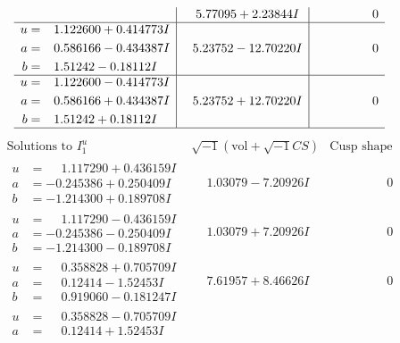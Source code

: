 \documentclass[1p]{elsarticle_modified}
\theoremstyle{definition}
\newcommand{\I}{\sqrt{-1}}
\begin{document}
$$\begin{array}{c|c|c}
 & \phantom{-}5.77095 + 2.23844 I & \phantom{-0.000000 } 0 \\ \hline\begin{aligned}
u &= \phantom{-}1.122600 + 0.414773 I \\
a &= \phantom{-}0.586166 - 0.434387 I \\
b &= \phantom{-}1.51242 - 0.18112 I\end{aligned}
 & \phantom{-}5.23752 - 12.70220 I & \phantom{-0.000000 } 0 \\ \hline\begin{aligned}
u &= \phantom{-}1.122600 - 0.414773 I \\
a &= \phantom{-}0.586166 + 0.434387 I \\
b &= \phantom{-}1.51242 + 0.18112 I\end{aligned}
 & \phantom{-}5.23752 + 12.70220 I & \phantom{-0.000000 } 0\\
 \hline 
 \end{array}$$\newpage$$\begin{array}{c|c|c}  
\text{Solutions to }I^u_{1}& \I (\text{vol} + \sqrt{-1}CS) & \text{Cusp shape}\\
 \hline 
\begin{aligned}
u &= \phantom{-}1.117290 + 0.436159 I \\
a &= -0.245386 + 0.250409 I \\
b &= -1.214300 + 0.189708 I\end{aligned}
 & \phantom{-}1.03079 - 7.20926 I & \phantom{-0.000000 } 0 \\ \hline\begin{aligned}
u &= \phantom{-}1.117290 - 0.436159 I \\
a &= -0.245386 - 0.250409 I \\
b &= -1.214300 - 0.189708 I\end{aligned}
 & \phantom{-}1.03079 + 7.20926 I & \phantom{-0.000000 } 0 \\ \hline\begin{aligned}
u &= \phantom{-}0.358828 + 0.705709 I \\
a &= \phantom{-}0.12414 - 1.52453 I \\
b &= \phantom{-}0.919060 - 0.181247 I\end{aligned}
 & \phantom{-}7.61957 + 8.46626 I & \phantom{-0.000000 } 0 \\ \hline\begin{aligned}
u &= \phantom{-}0.358828 - 0.705709 I \\
a &= \phantom{-}0.12414 + 1.52453 I \\

\end{aligned}
\end{array}$$
\end{document}
